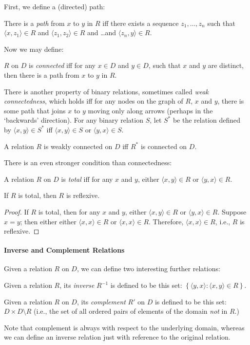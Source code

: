 First, we define a (directed) path: \begin{definition}[Path]
	There is a \emph{path} from $x$ to $y$ in $R$ iff there exists a sequence $z_{1},\ldots,z_{n}$ such that $\langle x,z_{1}\rangle \in R$ and
	$\langle z_{1},z_{2}\rangle \in R$ and \ldots and $\langle z_{n},y\rangle \in R$.
\end{definition}
Now we may define: \begin{definition}
 	$R$ on $D$ is \emph{connected} iff for any $x \in D$ and $y \in D$, such that $x$ and $y$ are distinct, then there is a path from $x$ to $y$ in $R$. 
 \end{definition}
 There is another property of binary relations, sometimes called \emph{weak
connectedness}, which holds iff for any nodes on the graph of $R$, $x$ and $y$, there is
some path that joins $x$ to $y$ moving only along arrows (perhaps in
the `backwards' direction). For any binary relation $S$, let $S^{*}$ be the relation defined by $\langle x,y\rangle \in S^{*}$ iff $\langle x,y\rangle \in S$ or $\langle y,x\rangle \in S$. \begin{definition}
	A relation $R$ is weakly connected on $D$ iff  $R^{*}$ is connected on $D$.
\end{definition} 

There is an even stronger condition than connectedness: \begin{definition}[Totality]
  A relation $R$ on $D$ is \emph{total} iff for any $x$ and $y$, either $\langle x,y\rangle \in R$ or $\langle y,x\rangle \in R$.
\end{definition}\begin{theorem}\label{tot}
  If $R$ is total, then $R$ is reflexive.
  \begin{proof}
     If $R$ is total, then for any $x$ and $y$, either $\langle x,y\rangle \in R$ or $\langle y,x\rangle \in R$. Suppose $x=y$; then either either $\langle x,x\rangle \in R$ or $\langle x,x\rangle \in R$. Therefore, $\langle x,x\rangle \in R$, i.e., $R$ is reflexive.
   \end{proof} 
\end{theorem}

\paragraph{Inverse and Complement Relations}

Given a relation $R$ on $D$, we can define two interesting further relations: \begin{definition}[Inverse]
Given a relation $R$, its \emph{inverse} $R^{-1}$ is defined to be this set: $\left\{\langle y,x\rangle:\langle x,y\rangle \in R\right\}$. \end{definition}
\begin{definition}[Complement]
Given a relation $R$ on $D$, its \emph{complement} $R'$ on $D$ is defined to be this set: $D \times D \setminus R$ (i.e., the set of all ordered pairs of elements of the domain \emph{not} in $R$.)
 \end{definition} Note that complement is always with respect to the underlying domain, whereas we can define an inverse relation just with reference to the original relation.

